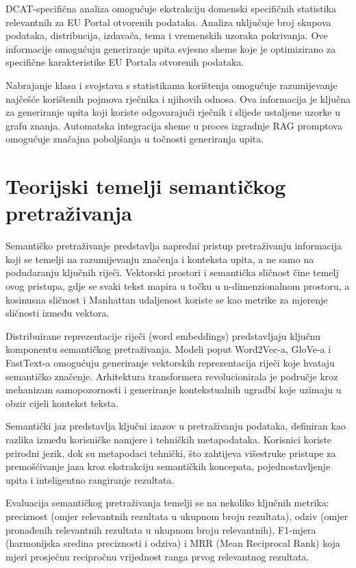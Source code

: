 DCAT-specifična analiza omogućuje ekstrakciju domenski specifičnih statistika relevantnih za EU Portal otvorenih podataka. Analiza uključuje broj skupova podataka, distribucija, izdavača, tema i vremenskih uzoraka pokrivanja. Ove informacije omogućuju generiranje upita svjesno sheme koje je optimizirano za specifične karakteristike EU Portala otvorenih podataka.

Nabrajanje klasa i svojstava s statistikama korištenja omogućuje razumijevanje najčešće korištenih pojmova rječnika i njihovih odnosa. Ova informacija je ključna za generiranje upita koji koriste odgovarajući rječnik i slijede ustaljene uzorke u grafu znanja. Automatska integracija sheme u proces izgradnje RAG promptova omogućuje značajna poboljšanja u točnosti generiranja upita.

\section{Teorijski temelji semantičkog pretraživanja}
\label{sec:semantic_search_theory}

Semantičko pretraživanje predstavlja napredni pristup pretraživanju informacija koji se temelji na razumijevanju značenja i konteksta upita, a ne samo na podudaranju ključnih riječi. Vektorski prostori i semantička sličnost čine temelj ovog pristupa, gdje se svaki tekst mapira u točku u n-dimenzionalnom prostoru, a kosinusna sličnost i Manhattan udaljenost koriste se kao metrike za mjerenje sličnosti između vektora.

Distribuirane reprezentacije riječi (word embeddings) predstavljaju ključnu komponentu semantičkog pretraživanja. Modeli poput Word2Vec-a, GloVe-a i FastText-a omogućuju generiranje vektorskih reprezentacija riječi koje hvataju semantičko značenje. Arhitektura transformera revolucionirala je područje kroz mehanizam samopozornosti i generiranje kontekstualnih ugradbi koje uzimaju u obzir cijeli kontekst teksta.

Semantički jaz predstavlja ključni izazov u pretraživanju podataka, definiran kao razlika između korisničke namjere i tehničkih metapodataka. Korisnici koriste prirodni jezik, dok su metapodaci tehnički, što zahtijeva višestruke pristupe za premošćivanje jaza kroz ekstrakciju semantičkih koncepata, pojednostavljenje upita i inteligentno rangiranje rezultata.

Evaluacija semantičkog pretraživanja temelji se na nekoliko ključnih metrika: preciznost (omjer relevantnih rezultata u ukupnom broju rezultata), odziv (omjer pronađenih relevantnih rezultata u ukupnom broju relevantnih), F1-mjera (harmonijska sredina preciznosti i odziva) i MRR (Mean Reciprocal Rank) koja mjeri prosječnu recipročnu vrijednost ranga prvog relevantnog rezultata.

